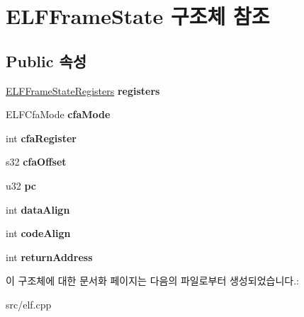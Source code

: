 \hypertarget{struct_e_l_f_frame_state}{}\section{E\+L\+F\+Frame\+State 구조체 참조}
\label{struct_e_l_f_frame_state}
\subsection*{Public 속성}
\begin{DoxyCompactItemize}
\item 
\mbox{\label{struct_e_l_f_frame_state_a581c2ecc500b258e244b75057eade6d2}} 
\mbox{\hyperlink{struct_e_l_f_frame_state_registers}{E\+L\+F\+Frame\+State\+Registers}} {\bfseries registers}
\item 
\mbox{\label{struct_e_l_f_frame_state_a4884a1a012a3593b5e9911775d53e1bc}} 
E\+L\+F\+Cfa\+Mode {\bfseries cfa\+Mode}
\item 
\mbox{\label{struct_e_l_f_frame_state_ab70d9959aa4b747f95b792ce0823979c}} 
int {\bfseries cfa\+Register}
\item 
\mbox{\label{struct_e_l_f_frame_state_a944cba546e5de720d2c88bf80c3e1691}} 
s32 {\bfseries cfa\+Offset}
\item 
\mbox{\label{struct_e_l_f_frame_state_abc2236d70ad34a4e4755c842b302bff1}} 
u32 {\bfseries pc}
\item 
\mbox{\label{struct_e_l_f_frame_state_add20f26010b7c129b0473ca59c6feb84}} 
int {\bfseries data\+Align}
\item 
\mbox{\label{struct_e_l_f_frame_state_ad5a26df4f99f4d5bdcfaea413e40b932}} 
int {\bfseries code\+Align}
\item 
\mbox{\label{struct_e_l_f_frame_state_a3b450cc1d351b131706b7f99a606c2f4}} 
int {\bfseries return\+Address}
\end{DoxyCompactItemize}


이 구조체에 대한 문서화 페이지는 다음의 파일로부터 생성되었습니다.\+:\begin{DoxyCompactItemize}
\item 
src/elf.\+cpp\end{DoxyCompactItemize}
